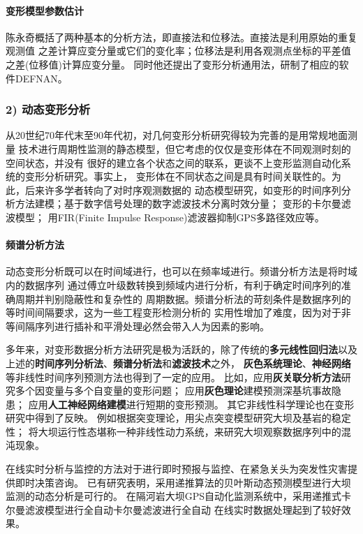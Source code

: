 \paragraph*{变形模型参数估计}
陈永奇概括了两种基本的分析方法，即直接法和位移法。直接法是利用原始的重复观测值
之差计算应变分量或它们的变化率；位移法是利用各观测点坐标的平差值之差(位移值)计算应变分量。
同时他还提出了变形分析通用法，研制了相应的软件DEFNAN。

\subsubsection*{2) 动态变形分析}
从20世纪70年代末至90年代初，对几何变形分析研究得较为完善的是用常规地面测量
技术进行周期性监测的静态模型，但它考虑的仅仅是变形体在不同观测时刻的空间状态，并没有
很好的建立各个状态之间的联系，更谈不上变形监测自动化系统的变形分析研究。事实上，
变形体在不同状态之间是具有时间关联性的。为此，后来许多学者转向了对时序观测数据的
动态模型研究，如变形的时间序列分析方法建模；基于数字信号处理的数字滤波技术分离时效分量；
变形的卡尔曼滤波模型；
用FIR(Finite Impulse Response)滤波器抑制GPS多路径效应等。
\paragraph*{频谱分析方法}
动态变形分析既可以在时间域进行，也可以在频率域进行。频谱分析方法是将时域内的数据序列
通过傅立叶级数转换到频域内进行分析，有利于确定时间序列的准确周期并判别隐蔽性和复杂性的
周期数据。频谱分析法的苛刻条件是数据序列的等时间间隔要求，这为一些工程变形检测分析的
实用性增加了难度，因为对于非等间隔序列进行插补和平滑处理必然会带入人为因素的影响。

多年来，对变形数据分析方法研究是极为活跃的，除了传统的\textbf{多元线性回归法}以及
上述的\textbf{时间序列分析法}、\textbf{频谱分析法}和\textbf{滤波技术}之外，
\textbf{灰色系统理论}、\textbf{神经网络}等非线性时间序列预测方法也得到了一定的应用。
比如，应用\textbf{灰关联分析方法}研究多个因变量与多个自变量的变形问题；
应用\textbf{灰色理论}建模预测深基坑事故隐患；
应用\textbf{人工神经网络建模}进行短期的变形预测。
其它非线性科学理论也在变形研究中得到了反映。
例如根据突变理论，用尖点突变模型研究大坝及基岩的稳定性；
将大坝运行性态堪称一种非线性动力系统，来研究大坝观察数据序列中的混沌现象。

在线实时分析与监控的方法对于进行即时预报与监控、在紧急关头为突发性灾害提供即时决策咨询。
已有研究表明，采用递推算法的贝叶斯动态预测模型进行大坝监测的动态分析是可行的。
在隔河岩大坝GPS自动化监测系统中，采用递推式卡尔曼滤波模型进行全自动卡尔曼滤波进行全自动
在线实时数据处理起到了较好效果。

